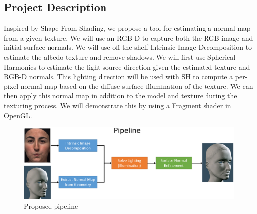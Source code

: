 \documentclass[10pt,twocolumn,letterpaper]{article}
\begin{document}
\subsection{Project Description}
Inspired by Shape-From-Shading, we propose a tool for estimating a normal map from a given texture. We will use an RGB-D to capture both the RGB image and initial surface normals. We will use off-the-shelf Intrinsic Image Decomposition to estimate the albedo texture and remove shadows. We will first use Spherical Harmonics to estimate the light source direction given the estimated texture and RGB-D normals. This lighting direction will be used with SH to compute a per-pixel normal map based on the diffuse surface illumination of the texture. We can then apply this normal map in addition to the model and texture during the texturing process. We will demonstrate this by using a Fragment shader in OpenGL.
\begin{figure}[!h]
	\begin{center}
		\includegraphics [scale=0.35] {image/pipeline.png}
	\end{center}
	\caption{Proposed pipeline}
	\label{fig:pipe1}
\end{figure} 
\end{document}
